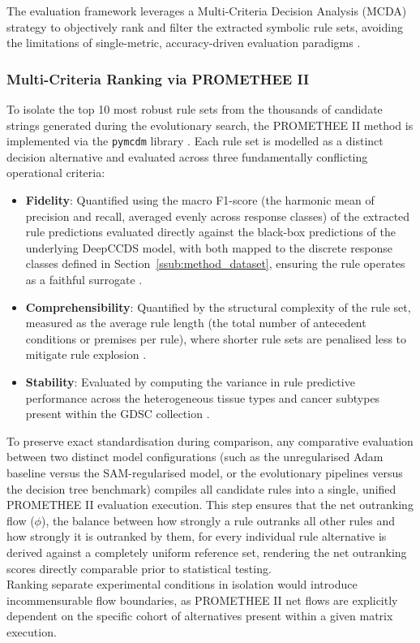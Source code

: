 \label{ssub:method_evaluation_strategy}
The evaluation framework leverages a Multi-Criteria Decision Analysis (MCDA) strategy 
to objectively rank and filter the extracted symbolic rule sets, avoiding the 
limitations of single-metric, accuracy-driven evaluation paradigms \cite{Matejova2025}.

\subsubsection{Multi-Criteria Ranking via PROMETHEE II}
\label{ssub:method_promethee}
To isolate the top 10 most robust rule sets from the thousands of candidate strings 
generated during the evolutionary search, the PROMETHEE II method is implemented via 
the \texttt{pymcdm} library \cite{Yedjour2024}. Each rule set is modelled as a distinct 
decision alternative and evaluated across three fundamentally conflicting operational 
criteria:
\begin{itemize}
    \item \textbf{Fidelity}: Quantified using the macro F1-score (the harmonic mean of precision and
    recall, averaged evenly across response classes) of the extracted rule
    predictions evaluated directly against the black-box predictions of the underlying 
    DeepCCDS model, with both mapped to the discrete response classes defined in
    Section~\ref{ssub:method_dataset}, ensuring the rule operates as a faithful surrogate
    \cite{Guidotti2021}.
    \item \textbf{Comprehensibility}: Quantified by the structural complexity of the 
    rule set, measured as the average rule length (the total number of antecedent 
    conditions or premises per rule), where shorter rule sets are penalised less to 
    mitigate rule explosion \cite{Yedjour2024}.
    \item \textbf{Stability}: Evaluated by computing the variance in rule predictive 
    performance across the heterogeneous tissue types and cancer subtypes present within 
    the GDSC collection \cite{Ye2024}.
\end{itemize}
\noindent
To preserve exact standardisation during comparison, any comparative evaluation between 
two distinct model configurations (such as the unregularised Adam baseline versus the 
SAM-regularised model, or the evolutionary pipelines versus the decision tree benchmark) 
compiles all candidate rules into a single, unified PROMETHEE II evaluation execution. 
This step ensures that the net outranking flow ($\phi$), the balance between how strongly a rule
outranks all other rules and how strongly it is outranked by them, for every individual rule
alternative is derived against a completely uniform reference set, rendering the net 
outranking scores directly comparable prior to statistical testing. 
\\
Ranking separate experimental conditions in isolation would introduce incommensurable 
flow boundaries, as PROMETHEE II net flows are explicitly dependent on the specific 
cohort of alternatives present within a given matrix execution.

